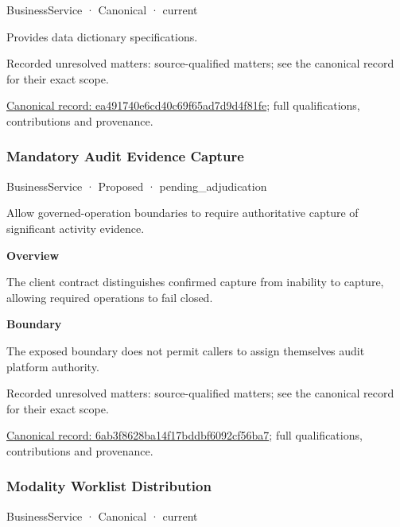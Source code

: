 \label{element:ea491740e6cd40c69f65ad7d9d4f81fe}
{\small BusinessService · Canonical · current}\par

Provides data dictionary specifications.


{\small Recorded unresolved matters: source-qualified matters; see the canonical record for their exact scope.}\par
{\footnotesize \href{../../../../continuum/business/business-service/ea491740e6cd40c69f65ad7d9d4f81fe.md}{Canonical record: ea491740e6cd40c69f65ad7d9d4f81fe}; full qualifications, contributions and provenance.}\par
\subsubsection{Mandatory Audit Evidence Capture}

\label{element:6ab3f8628ba14f17bddbf6092cf56ba7}
{\small BusinessService · Proposed · pending\_adjudication}\par

Allow governed-operation boundaries to require authoritative capture of significant activity evidence.



\textbf{Overview}



The client contract distinguishes confirmed capture from inability to capture, allowing required operations to fail closed.



\textbf{Boundary}



The exposed boundary does not permit callers to assign themselves audit platform authority.


{\small Recorded unresolved matters: source-qualified matters; see the canonical record for their exact scope.}\par
{\footnotesize \href{../../../../continuum/business/business-service/6ab3f8628ba14f17bddbf6092cf56ba7.md}{Canonical record: 6ab3f8628ba14f17bddbf6092cf56ba7}; full qualifications, contributions and provenance.}\par
\subsubsection{Modality Worklist Distribution}

\label{element:e254b6a140c94b33a206e74db1aecfbb}
{\small BusinessService · Canonical · current}\par

